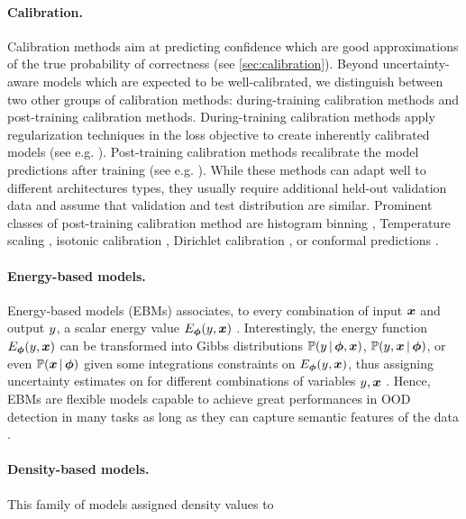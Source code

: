 \paragraph*{Calibration.} Calibration methods aim at predicting confidence which are good approximations of the true probability of correctness (see \cref{sec:calibration}). Beyond uncertainty-aware models which are expected to be well-calibrated, we distinguish between two other groups of calibration methods: during-training calibration methods and post-training calibration methods. During-training calibration methods apply regularization techniques in the loss objective to create inherently calibrated models (see e.g. \cite{lee2018training,corbieres2019confidence,minderer2021revisiting}). Post-training calibration methods recalibrate the model predictions after training (see e.g. \cite{calibration-network,wenger201calibration}). While these methods can adapt well to different architectures types, they usually require additional held-out validation data and assume that validation and test distribution are similar. Prominent classes of post-training calibration method are histogram binning \cite{zadrozny2001calibrated}, Temperature scaling \cite{calibration-network}, isotonic calibration \cite{zadrozny2002transforming}, Dirichlet calibration \cite{kull2019beyond}, or conformal predictions \cite{conformal-survey,marx2022conformal}.

\paragraph*{Energy-based models.} Energy-based models (EBMs) associates, to every combination of input $\bm{x}$ and output $y$, a scalar energy value $E_{\bm{\phi}}(y, \bm{x})$ \cite{lecun2006tutorial}. Interestingly, the energy function $E_{\bm{\phi}}(y, \bm{x})$ can be transformed into Gibbs distributions $\mathbb{P}(y \,|\, \bm{\phi}, \bm{x})$, $\mathbb{P}(y, \bm{x} \,|\, \bm{\phi})$, or even $\mathbb{P}(\bm{x} \,|\, \bm{\phi})$ given some integrations constraints on $E_{\bm{\phi}}(y, \bm{x})$, thus assigning uncertainty estimates on for different combinations of variables $y, \bm{x}$ \cite{energy_based_classifier}. Hence, EBMs are flexible models capable to achieve great performances in OOD detection in many tasks \citep{energy-ood,wang2021ebm} as long as they can capture semantic features of the data \cite{ood_ebm}.

\paragraph*{Density-based models.} This family of models assigned density values to 

